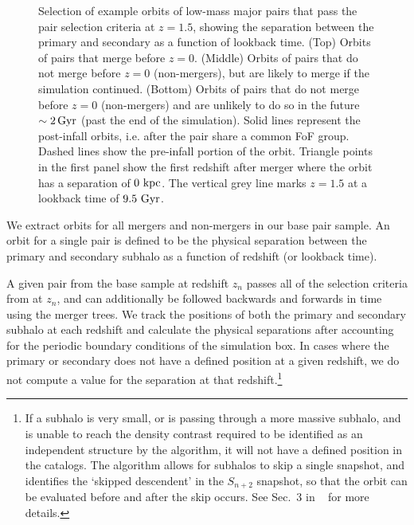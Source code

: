 \documentclass[twocolumn,linenumbers]{aastex631}
\newcommand{\chambe}{\citet{Chamberlain2024}}
\begin{document}
\begin{figure}[tb]
\begin{center}
    \caption{Selection of example orbits of low-mass major pairs that pass the pair selection criteria at $z=1.5$, showing the separation between the primary and secondary as a function of lookback time. 
    (Top) Orbits of pairs that merge before $z=0$.
    (Middle) Orbits of pairs that do not merge before $z=0$ (non-mergers), but are likely to merge if the simulation continued. 
    (Bottom) Orbits of pairs that do not merge before $z=0$ (non-mergers) and are unlikely to do so in the future $\sim2\mathrm{\,Gyr}$ (past the end of the simulation).
    Solid lines represent the post-infall orbits, i.e. after the pair share a common FoF group.
    Dashed lines show the pre-infall portion of the orbit. 
    Triangle points in the first panel show the first redshift after merger where the orbit has a separation of $0\,\mathrm{\,kpc}$.
    The vertical grey line marks $z=1.5$ at a lookback time of $9.5\,\mathrm{\,Gyr}$. 
    }
    \label{fig:example-orbits}
    \end{center}
\end{figure}

We extract orbits for all mergers and non-mergers in our base pair sample. 
An orbit for a single pair is defined to be the physical separation between the primary and secondary subhalo as a function of redshift (or lookback time). 

A given pair from the base sample at redshift $z_n$ passes all of the selection criteria from \chambe{} at $z_n$, and can additionally be followed backwards and forwards in time using the \sublink{} merger trees. 
We track the positions of both the primary and secondary subhalo at each redshift and calculate the physical separations after accounting for the periodic boundary conditions of the simulation box.
In cases where the primary or secondary does not have a defined position at a given redshift, we do not compute a value for the separation at that redshift.\footnote{If a subhalo is very small, or is passing through a more massive subhalo, and is unable to reach the density contrast required to be identified as an independent structure by the \subfind{} algorithm, it will not have a defined position in the \sublink{} catalogs. The \sublink{} algorithm allows for subhalos to skip a single snapshot, and identifies the `skipped descendent' in the $S_{n+2}$ snapshot, so that the orbit can be evaluated before and after the skip occurs. See Sec.~3 in ~\citet{RG2015} for more details.}
\end{document}
